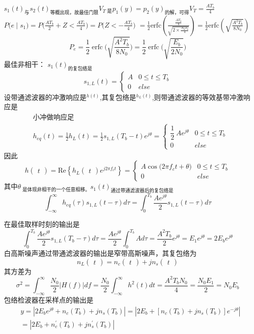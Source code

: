 \documentclass[utf8]{article}
\begin{document}
$s_{1}(t)_{\text{与}}s_{2}(t)_{\text{等概出现，故最佳门限}}V_{T\text{ 是}}p_{1}(y)=p_{2}(y)_{\text{的解，可得}}V_{T}=\frac{AT_{b}}{4}$
$P\Big(e\mid s_{1}\Big)=P\Big(\frac{AT_{b}}{2}+Z<\frac{AT_{b}}{4}\Big)=P\Big(Z<-\frac{AT_{b}}{4}\Big)$
$=\frac{1}{2}$erfc$\left(\frac{\frac{AT_b}4}{\sqrt{2\times\frac{N_0T_b}4}}\right)=\frac12$erfc$\left(\sqrt{\frac{A^2T_b}{8N_0}}\right)$
$$P_e=\frac{1}{2}\operatorname{erfc}\Bigg(\sqrt{\frac{A^2T_b}{8N_0}}\Bigg)=\frac{1}{2}\operatorname{erfc}\Bigg(\sqrt{\frac{E_b}{2N_0}}\Bigg)$$
最佳非相干：
$s_1(t)_\text{的复包络是}$
$$s_{1,L}\left(t\right)=\begin{cases}A&0\leq t\leq T_b\\0&else\end{cases}$$
设带通滤波器的冲激响应是$^{h(t)}$,其复包络是$^{h_L(t)}$,则带通滤波器的等效基带冲激响应是
$$\begin{aligned}&\text{小冲做响应足}\\&h_{eq}\left(t\right)=\frac{1}{2}h_{L}\left(t\right)=\frac{1}{2}s_{1,L}\left(T_{b}-t\right)e^{j\theta}=\begin{cases}\dfrac{1}{2}\:Ae^{j\theta}&0\leq t\leq T_{b}\\[2ex]0&else\end{cases}\end{aligned}$$
因此
$$h\begin{pmatrix}t\end{pmatrix}=\mathrm{Re}\left\{h_{L}\begin{pmatrix}t\end{pmatrix}e^{j2\pi f_{c}t}\right\}=\begin{cases}A\cos\bigl(2\pi f_{c}t+\theta\bigr)&0\leq t\leq T_{b}\\0&else\end{cases}$$
其中$\theta_\text{ 是体现非相干的一个任意相移。}s_1(t)_{\text{通过带通滤波器后的复包络是}}$
$$\int_{-\infty}^{\infty}h_{eq}\left(\tau\right)s_{1,L}\left(t-\tau\right)d\tau=\int_{0}^{T_{b}}\frac{Ae^{j\theta}}{2}s_{1,L}\left(t-\tau\right)d\tau $$

在最佳取样时刻的输出是
$$\int_0^{T_b}\frac{Ae^{j\theta}}{2}s_{1,L}\left(T_b-\tau\right)d\tau=\frac{Ae^{j\theta}}{2}\int_0^{T_b}Ad\tau=\frac{A^2T_b}{2}e^{j\theta}=E_1e^{j\theta}=2E_be^{j\theta}$$
白高斯噪声通过带通滤波器的输出是窄带高斯噪声，其复包络为
$$n_L\begin{pmatrix}t\end{pmatrix}=n_c\begin{pmatrix}t\end{pmatrix}+jn_s\begin{pmatrix}t\end{pmatrix}$$
其方差为
$$\sigma^{2}=\int_{-\infty}^{\infty}\frac{N_{0}}{2}\Big|H\left(f\right)\Big|df=\frac{N_{0}}{2}\int_{-\infty}^{\infty}h^{2}\left(t\right)dt=\frac{A^{2}T_{b}N_{0}}{4}=\frac{N_{0}E_{1}}{2}=N_{0}E_{b}$$
包络检波器在采样点的输出是
$$\begin{aligned}&y=\left|2E_{b}e^{j\theta}+n_{c}\left(T_{b}\right)+jn_{s}\left(T_{b}\right)\right|=\left|2E_{b}+\left[n_{c}\left(T_{b}\right)+jn_{s}\left(T_{b}\right)\right]e^{-j\theta}\right|\\&=\left|2E_{b}+n_{c}^{\prime}\left(T_{b}\right)+jn_{s}^{\prime}\left(T_{b}\right)\right|\end{aligned}$$
\end{document}
